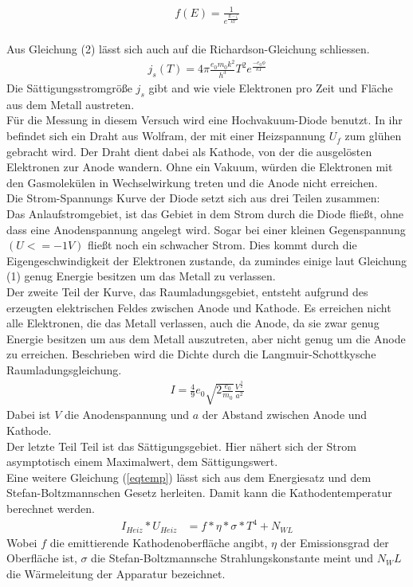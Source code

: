 \begin{align}
f(E)=\frac{1}{e^\frac{E-\zeta}{kT}}
\end{align}
\\
Aus Gleichung (2) lässt sich auch auf die Richardson-Gleichung schliessen.
\begin{align}
j_s(T)=4\pi\frac{e_0 m_0 k^2}{h^3}T^2e^\frac{-e_0\phi}{kT} \label{eqrichard}
\end{align}
Die Sättigungsstromgröße $j_s$ gibt and wie viele Elektronen pro Zeit und Fläche aus dem Metall austreten.
\\
Für die Messung in diesem Versuch wird eine Hochvakuum-Diode benutzt. In ihr befindet sich ein Draht aus Wolfram, der mit einer Heizspannung $U_f$ zum glühen gebracht wird. Der Draht dient dabei als Kathode, von der die ausgelösten Elektronen zur Anode wandern. Ohne ein Vakuum, würden die Elektronen mit den Gasmolekülen in Wechselwirkung treten und die Anode nicht erreichen.
\\
Die Strom-Spannungs Kurve der Diode setzt sich aus drei Teilen zusammen:
\\
Das Anlaufstromgebiet, ist das Gebiet in dem Strom durch die Diode fließt, ohne dass eine Anodenspannung angelegt wird. Sogar bei einer kleinen Gegenspannung $(U<=-1V)$ fließt noch ein schwacher Strom. Dies kommt durch die Eigengeschwindigkeit der Elektronen zustande, da zumindes einige laut Gleichung (1) genug Energie besitzen um das Metall zu verlassen.
\\
Der zweite Teil der Kurve, das Raumladungsgebiet, entsteht aufgrund des erzeugten elektrischen Feldes zwischen Anode und Kathode. Es erreichen nicht alle Elektronen, die das Metall verlassen, auch die Anode, da sie zwar genug Energie besitzen  um aus dem Metall auszutreten, aber nicht genug um die Anode zu erreichen.
Beschrieben wird die Dichte durch die Langmuir-Schottkysche Raumladungsgleichung.
\begin{align}
I=\frac49e_0\sqrt{2\frac{e_0}{m_0}}\frac{V^\frac32}{a^2} \label{eqlangmuir}
\end{align}
Dabei ist $V$ die Anodenspannung und $a$ der Abstand zwischen Anode und Kathode.
\\
Der letzte Teil Teil ist das Sättigungsgebiet. Hier nähert sich der Strom asymptotisch einem Maximalwert, dem Sättigungswert. \\

Eine weitere Gleichung (\ref{eqtemp}) lässt sich aus dem Energiesatz und dem Stefan-Boltzmannschen Gesetz \cite{anleitung}
herleiten. Damit kann die Kathodentemperatur berechnet werden.
\begin{align}
I_{Heiz}*U_{Heiz}&=f*\eta*\sigma*T^4+N_{WL} \label{eqtemp}
\end{align}
Wobei $f$ die emittierende Kathodenoberfläche angibt, $\eta$ der Emissionsgrad der Oberfläche ist, $\sigma$ 
die Stefan-Boltzmannsche Strahlungskonstante meint und $N_WL$ die Wärmeleitung der Apparatur bezeichnet.




